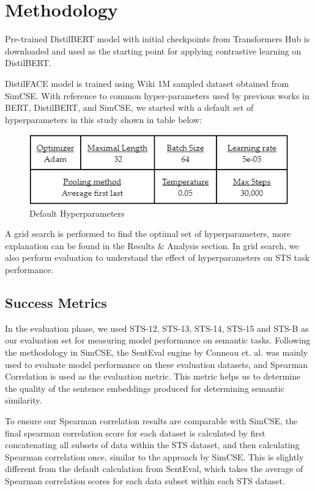 \documentclass[10pt,twocolumn,letterpaper]{article}
\begin{document}
\section{Methodology}

Pre-trained DistilBERT model with initial checkpoints from Transformers Hub is downloaded and used as the starting point for applying contrastive learning on DistilBERT.

DistilFACE model is trained using Wiki 1M sampled dataset obtained from SimCSE. With reference to common hyper-parameters used by previous works in BERT, DistilBERT, and SimCSE, we started with a default set of hyperparameters in this study shown in table below:

\begin{figure}[hbt!]
\centering
\includegraphics[scale=0.57]{images/Default-Hyperparameters.png}
\caption{Default Hyperparameters}
\label{fig:short}
\end{figure}

A grid search is performed to find the optimal set of hyperparameters, more explanation can be found in the Results \& Analysis section. In grid search, we also perform evaluation to understand the effect of hyperparameters on STS task performance.

\subsection{Success Metrics}

In the evaluation phase, we used STS-12, STS-13, STS-14, STS-15 and STS-B as our evaluation set for measuring model performance on semantic tasks. Following the methodology in SimCSE, the SentEval engine by Conneau et. al. \cite{1803.05449} was mainly used to evaluate model performance on these evaluation datasets, and Spearman Correlation is used as the evaluation metric. This metric helps us to determine the quality of the sentence embeddings produced for determining semantic similarity.

To ensure our Spearman correlation results are comparable with SimCSE, the final spearman correlation score for each dataset is calculated by first concatenating all subsets of data within the STS dataset, and then calculating Spearman correlation once, similar to the approach by SimCSE. This is slightly different from the default calculation from SentEval, which takes the average of Spearman correlation scores for each data subset within each STS dataset.
\end{document}
